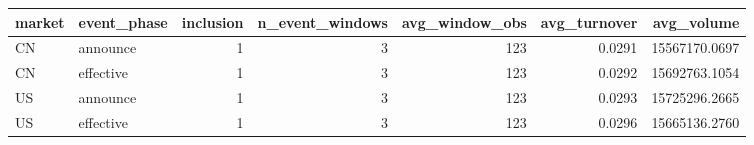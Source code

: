\begin{tabular}{llrrrrr}
\toprule
market & event_phase & inclusion & n_event_windows & avg_window_obs & avg_turnover & avg_volume \\
\midrule
CN & announce & 1 & 3 & 123 & 0.0291 & 15567170.0697 \\
CN & effective & 1 & 3 & 123 & 0.0292 & 15692763.1054 \\
US & announce & 1 & 3 & 123 & 0.0293 & 15725296.2665 \\
US & effective & 1 & 3 & 123 & 0.0296 & 15665136.2760 \\
\bottomrule
\end{tabular}
